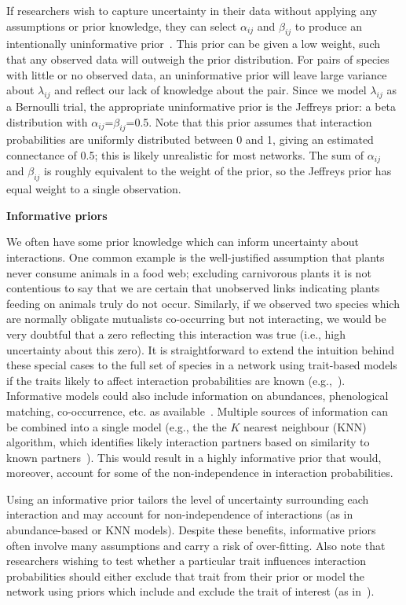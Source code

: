 \documentclass[12pt]{article}
\begin{document}
\begin{spacing}{1.5}
        If researchers wish to capture uncertainty in their data without applying any assumptions or prior knowledge, they can select $\alpha_{ij}$ and $\beta_{ij}$ to produce an intentionally uninformative prior~\citep{Leyland2005,Berger2006}. This prior can be given a low weight, such that any observed data will outweigh the prior distribution. For pairs of species with little or no observed data, an uninformative prior will leave large variance about $\lambda_{ij}$ and reflect our lack of knowledge about the pair. Since we model $\lambda_{ij}$ as a Bernoulli trial, the appropriate uninformative prior is the Jeffreys prior: a beta distribution with $\alpha_{ij}$=$\beta_{ij}$=0.5. Note that this prior assumes that interaction probabilities are uniformly distributed between 0 and 1, giving an estimated connectance of 0.5; this is likely unrealistic for most networks. The sum of $\alpha_{ij}$ and $\beta_{ij}$ is roughly equivalent to the weight of the prior, so the Jeffreys prior has equal weight to a single observation. 


      \textbf{Informative priors}

        We often have some prior knowledge which can inform uncertainty about interactions. One common example is the well-justified assumption that plants never consume animals in a food web; excluding carnivorous plants it is not contentious to say that we are certain that unobserved links indicating plants feeding on animals truly do not occur. Similarly, if we observed two species which are normally obligate mutualists co-occurring but not interacting, we would be very doubtful that a zero reflecting this interaction was true (i.e., high uncertainty about this zero). It is straightforward to extend the intuition behind these special cases to the full set of species in a network using trait-based models if the traits likely to affect interaction probabilities are known (e.g.,~\citet{Gravel2013,Bartomeus2016,Weinstein2017}). Informative models could also include information on abundances, phenological matching, co-occurrence, etc. as available~\citep{Jordano2016,Weinstein2017a,Gravel2018}. Multiple sources of information can be combined into a single model (e.g., the the $K$ nearest neighbour (KNN) algorithm, which identifies likely interaction partners based on similarity to known partners~\citep{DesjardinsProulx2017}). This would result in a highly informative prior that would, moreover, account for some of the non-independence in interaction probabilities. 


        Using an informative prior tailors the level of uncertainty surrounding each interaction and may account for non-independence of interactions (as in abundance-based or KNN models). Despite these benefits, informative priors often involve many assumptions and carry a risk of over-fitting. Also note that researchers wishing to test whether a particular trait influences interaction probabilities should either exclude that trait from their prior or model the network using priors which include and exclude the trait of interest (as in~\citet{Weinstein2017a}).



\end{spacing}
\end{document}

